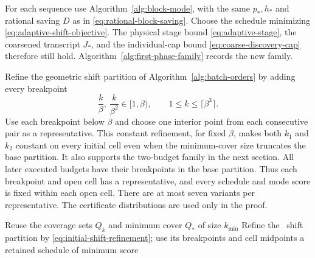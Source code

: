 For each sequence use Algorithm~\ref{alg:block-mode}, with the same
$p_*,h_*$ and rational saving $D$ as in
\eqref{eq:rational-block-saving}. Choose the schedule minimizing
\eqref{eq:adaptive-shift-objective}. The physical stage bound
\eqref{eq:adaptive-stage}, the coarsened transcript
$J_*$, and the individual-cap bound
\eqref{eq:coarse-discovery-cap} therefore still hold.
Algorithm~\ref{alg:first-phase-family} records the new family.

Refine the geometric shift partition of
Algorithm~\ref{alg:batch-orders} by adding every breakpoint
\begin{equation}\label{eq:initial-shift-refinement}
 \frac{k}{\beta},\ \frac{k}{\beta^2}\in[1,\beta),
 \qquad 1\le k\le\lceil\beta^3\rceil.
\end{equation}
Use each breakpoint below $\beta$ and choose one interior point from
each consecutive pair as a representative. This constant
refinement, for fixed $\beta$, makes both $k_1$ and $k_2$ constant
on every initial cell even when the minimum-cover size truncates the
base partition. It also supports the two-budget family in the next
section. All later executed budgets have their breakpoints in the
base partition. Thus each breakpoint and open cell has a representative,
and every schedule and mode score is fixed within each open cell. There
are at most seven variants per representative. The
certificate distributions are used only in the proof.

\begin{algorithm}[H]
\caption{Improved first-phase family for \ExpectedTree}
\label{alg:first-phase-family}
Reuse the coverage sets $Q_k$ and minimum cover $Q_*$ of size $k_{\min}$\;
Refine the \BatchOrders\ shift partition by
\eqref{eq:initial-shift-refinement}; use its breakpoints and cell midpoints\;
\KwRet a retained schedule of minimum score\;
\end{algorithm}

